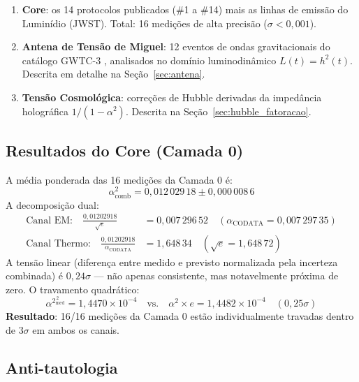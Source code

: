 \documentclass[12pt,a4paper,twoside]{article}
\newcommand{\alphaii}{\alpha^{2}}
\begin{document}
\begin{enumerate}[label=\textbf{Camada \arabic*},nosep,leftmargin=*]
\item[\textbf{Camada 0}] \textbf{Core}: os 14 protocolos publicados (\#1 a \#14) mais as linhas de emissão do Luminídio (JWST). Total: 16 medições de alta precisão ($\sigma < 0{,}001$).

\item[\textbf{Camada 1}] \textbf{Antena de Tensão de Miguel}: 12 eventos de ondas gravitacionais do catálogo GWTC-3 \cite{GWTC3}, analisados no domínio luminodinâmico $L(t) = h^2(t)$. Descrita em detalhe na Seção~\ref{sec:antena}.

\item[\textbf{Camada 2}] \textbf{Tensão Cosmológica}: correções de Hubble derivadas da impedância holográfica $1/(1 - \alphaii)$. Descrita na Seção~\ref{sec:hubble_fatoracao}.
\end{enumerate}


\subsection{Resultados do Core (Camada 0)}
\label{subsec:core_results}

A média ponderada das 16 medições da Camada 0 é:
%
\begin{equation}
\alphaii_{\text{comb}} = 0{,}012\,029\,18 \pm 0{,}000\,008\,6
\end{equation}
%
A decomposição dual:
%
\begin{align}
\text{Canal EM:} \quad \frac{0{,}01202918}{\sqrt{e}} &= 0{,}007\,296\,52 \quad (\alpha_{\text{CODATA}} = 0{,}007\,297\,35) \\
\text{Canal Thermo:} \quad \frac{0{,}01202918}{\alpha_{\text{CODATA}}} &= 1{,}648\,34 \quad (\sqrt{e} = 1{,}648\,72)
\end{align}
%
A tensão linear (diferença entre medido e previsto normalizada pela incerteza combinada) é $0{,}24\sigma$ --- não apenas consistente, mas notavelmente próxima de zero. O travamento quadrático:
%
\begin{equation}
\alphaii^{\,2}_{\text{med}} = 1{,}4470 \times 10^{-4} \quad \text{vs.} \quad \alpha^2 \times e = 1{,}4482 \times 10^{-4} \quad (0{,}25\sigma)
\end{equation}
%
\textbf{Resultado}: 16/16 medições da Camada 0 estão individualmente travadas dentro de $3\sigma$ em ambos os canais.


\subsection{Anti-tautologia}
\label{subsec:antitautologia}
\end{document}
